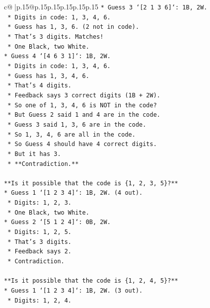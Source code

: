 \documentclass{article}
\begin{document}
{\begin{supertabular}{c@{$\;$}|p{.15\linewidth}@{}p{.15\linewidth}p{.15\linewidth}p{.15\linewidth}p{.15\linewidth}p{.15\linewidth}}
{{{\texttt{*   Guess 3 `{[}2 1 3 6{]}`: 1B, 2W.} \\
\texttt{    *   Digits in code: 1, 3, 4, 6.} \\
\texttt{    *   Guess has 1, 3, 6. (2 not in code).} \\
\texttt{    *   That's 3 digits. Matches!} \\
\texttt{    *   One Black, two White.} \\
\texttt{*   Guess 4 `{[}4 6 3 1{]}`: 1B, 2W.} \\
\texttt{    *   Digits in code: 1, 3, 4, 6.} \\
\texttt{    *   Guess has 1, 3, 4, 6.} \\
\texttt{    *   That's 4 digits.} \\
\texttt{    *   Feedback says 3 correct digits (1B + 2W).} \\
\texttt{    *   So one of 1, 3, 4, 6 is NOT in the code?} \\
\texttt{    *   But Guess 2 said 1 and 4 are in the code.} \\
\texttt{    *   Guess 3 said 1, 3, 6 are in the code.} \\
\texttt{    *   So 1, 3, 4, 6 are all in the code.} \\
\texttt{    *   So Guess 4 should have 4 correct digits.} \\
\texttt{    *   But it has 3.} \\
\texttt{    *   **Contradiction.**} \\
\\ 
\texttt{**Is it possible that the code is \{1, 2, 3, 5\}?**} \\
\texttt{*   Guess 1 `{[}1 2 3 4{]}`: 1B, 2W. (4 out).} \\
\texttt{    *   Digits: 1, 2, 3.} \\
\texttt{    *   One Black, two White.} \\
\texttt{*   Guess 2 `{[}5 1 2 4{]}`: 0B, 2W.} \\
\texttt{    *   Digits: 1, 2, 5.} \\
\texttt{    *   That's 3 digits.} \\
\texttt{    *   Feedback says 2.} \\
\texttt{    *   Contradiction.} \\
\\ 
\texttt{**Is it possible that the code is \{1, 2, 4, 5\}?**} \\
\texttt{*   Guess 1 `{[}1 2 3 4{]}`: 1B, 2W. (3 out).} \\
\texttt{    *   Digits: 1, 2, 4.} \\
}}}
\end{supertabular}}
\end{document}
